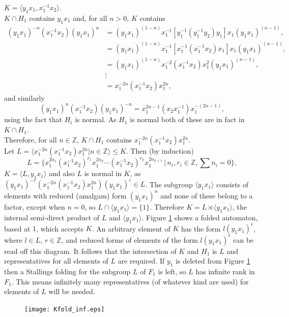 \documentclass[a4paper,12pt]{article}
\newcommand{\e}{\varepsilon }
\numberwithin{equation}{section}
\numberwithin{figure}{section}
\newcommand{\ZZ}{\ensuremath{\mathbb{Z}}}
\newcommand{\la}{\langle}
\newcommand{\ra}{\rangle}
\begin{document}
\par\noindent $K=\la y_1x_1,x_1^{-1}x_2\ra$. \\[1em]
$K\cap H_1$ contains $y_1x_1$ and, for all $n>0$, $K$ contains
\begin{align*}
(y_1x_1)^{-n}(x_1^{-1}x_2)(y_1x_1)^{n}&=(y_1x_1)^{(1-n)}x_1^{-1}[y_1^{-1}(y_1^{-1}y_2)y_1]x_1(y_1x_1)^{(n-1)},\\
&=(y_1x_1)^{(1-n)}x_1^{-1}[x_1^{-1}(x_1^{-1}x_2)x_1]x_1(y_1x_1)^{(n-1)},\\
&=(y_1x_1)^{(1-n)}x_1^{-2}(x_1^{-1}x_2)x_1^2(y_1x_1)^{(n-1)},\\
&\vdots\\
&=x_1^{-2n}(x_1^{-1}x_2) x_1^{2n},
\end{align*}
and similarly
\[(y_1x_1)^{n}(x_1^{-1}x_2)(y_1x_1)^{-n}=x_1^{2n-1}(x_2x_1^{-1}) x_1^{-(2n-1)},\]
 using the fact that $H_i$ is normal. 
As $H_1$ is normal both of these are in fact in $K\cap H_1$. \\[1em]
Therefore, for all $n\in \ZZ$, $K\cap H_1$ contains $x_1^{-2n}(x_1^{-1}x_2) x_1^{2n}$. \\[1em]
Let $L=\la x_1^{-2n}(x_1^{-1}x_2) x_1^{2n}|n\in \ZZ\ra\le K$. Then (by induction)  
\[L=\{x_1^{2n_1}(x_1^{-1}x_2)^{r_1}x_1^{2n_2}\cdots (x_1^{-1}x_2)^{r_k}x_1^{2n_{k+1}}\,|\,n_i,r_i\in\ZZ, \sum n_i=0\},\]
$K=\la L, y_1x_1\ra$ 
and also $L$ is normal in $K$, as $(y_1x_1)^{-\e}(x_1^{-2n}(x_1^{-1}x_2) x_1^{2n})(y_1x_1)^{\e}\in L$.  
The subgroup $\la y_1x_1\ra$ consists of elements with reduced (amalgam) form $(y_1x_1)^n$ and none 
of these belong to a factor, except when $n=0$, so $L\cap \la y_1x_1\ra=\{1\}$. 
Therefore
$K=L\rtimes \la y_1x_1\ra$, the internal semi-direct product of $L$ and $\la y_1x_1\ra$. 
Figure \ref{fig:Kfold_inf} shows a folded automaton, based at $1$, which accepts  $K$.
 An arbitrary element of $K$ has the form $l(y_1x_1)^r$, where $l\in L$, $r\in\ZZ$, and reduced forms of 
 elements of the form $l(y_1x_1)^r$ can be read off this diagram.  
It follows that 
 the intersection of $K$ and $H_1$ is $L$ and  representatives for all 
elements of $L$ are required. 
 If $y_1$ is deleted from Figure \ref{fig:Kfold_inf} 
 then a  Stallings folding for the subgroup $L$ of $F_1$ is left, so $L$ has infinite
rank in $F_1$. This means infinitely many representatives (of whatever kind are used) 
 for elements of $L$ will 
be needed. 
\begin{figure}
\begin{center}
\texttt{[image: Kfold\_inf.eps]}
\caption{}\label{fig:Kfold_inf}
\end{center}
\end{figure}
%
%
\end{document}
